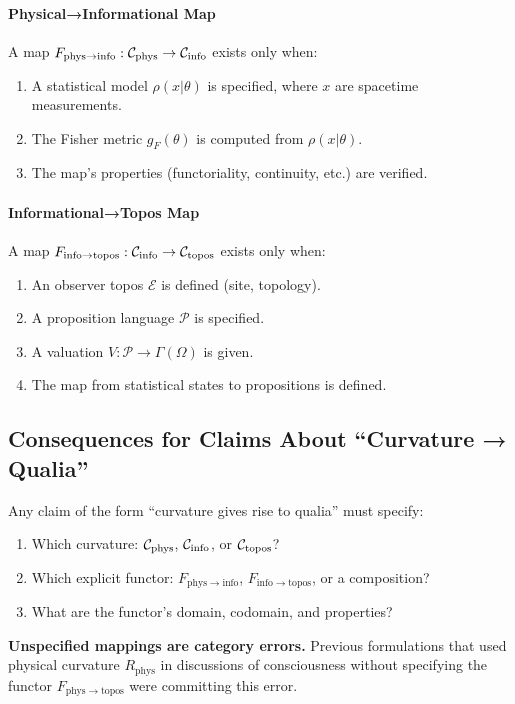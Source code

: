 \documentclass[11pt,titlepage]{article}
\begin{document}
\paragraph{Physical→Informational Map}
A map $F_{\mathrm{phys\to info}}: \mathcal{C}_{\mathrm{phys}} \to \mathcal{C}_{\mathrm{info}}$ exists only when:
\begin{enumerate}
    \item A statistical model $\rho(x|\theta)$ is specified, where $x$ are spacetime measurements.
    \item The Fisher metric $g_F(\theta)$ is computed from $\rho(x|\theta)$.
    \item The map's properties (functoriality, continuity, etc.) are verified.
\end{enumerate}

\paragraph{Informational→Topos Map}  
A map $F_{\mathrm{info\to topos}}: \mathcal{C}_{\mathrm{info}} \to \mathcal{C}_{\mathrm{topos}}$ exists only when:
\begin{enumerate}
    \item An observer topos $\mathcal{E}$ is defined (site, topology).
    \item A proposition language $\mathcal{P}$ is specified.
    \item A valuation $V: \mathcal{P} \to \Gamma(\Omega)$ is given.
    \item The map from statistical states to propositions is defined.
\end{enumerate}

\subsection{Consequences for Claims About ``Curvature → Qualia''}

Any claim of the form ``curvature gives rise to qualia'' must specify:
\begin{enumerate}
    \item Which curvature: $\mathcal{C}_{\mathrm{phys}}$, $\mathcal{C}_{\mathrm{info}}$, or $\mathcal{C}_{\mathrm{topos}}$?
    \item Which explicit functor: $F_{\mathrm{phys\to info}}$, $F_{\mathrm{info\to topos}}$, or a composition?
    \item What are the functor's domain, codomain, and properties?
\end{enumerate}

\textbf{Unspecified mappings are category errors.} Previous formulations that used physical curvature $R_{\mathrm{phys}}$ in discussions of consciousness without specifying the functor $F_{\mathrm{phys\to topos}}$ were committing this error.
\end{document}
